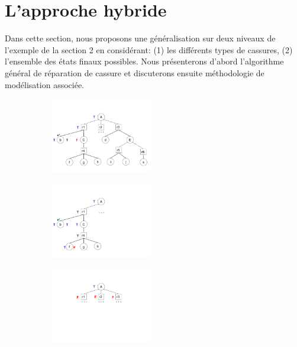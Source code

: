 \documentclass[a4paper,twoside,french]{article}
\begin{document}
		\section{L'approche hybride}
		Dans cette section, nous proposons une généralisation sur deux niveaux de l'exemple de la section 2 en considérant: (1) les différents types de cassures, (2) l'ensemble des états finaux possibles. Nous présenterons d'abord l'algorithme général de réparation de cassure et discuterons ensuite méthodologie de modélisation associée.
			\begin{figure}[t]
				\centering
				\begin{subfigure}{2.1in}
					\centerline{\includegraphics[height=1.3in]{figs/precondition}}
					\vskip 8pt 
				\end{subfigure}
				\hfill
				\begin{subfigure}{1.4in}
					\centerline{\includegraphics[height=1.3in]{figs/postcondition}}
					\vskip 8pt 
				\end{subfigure}
				\hfill
				\begin{subfigure}{1in}
					\centerline{\includegraphics[height=1.3in]{figs/applicability}}
					\vskip -2pt
				\end{subfigure}
				\vskip 4pt 
			\end{figure}
			
\end{document}
